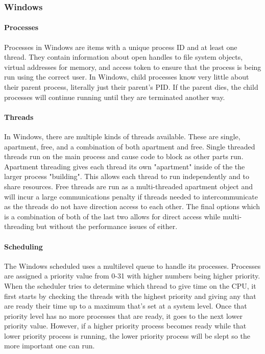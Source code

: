 \subsubsection{Windows}
\paragraph{Processes}
Processes in Windows are items with a unique process ID and at least one thread. They contain information about open handles to file system objects, virtual addresses for memory, and access token to ensure that the process is being run using the correct user. In Windows, child processes know very little about their parent process, literally just their parent's PID. If the parent dies, the child processes will continue running until they are terminated another way. 
\paragraph{Threads}
In Windows, there are multiple kinds of threads available. These are single, apartment, free, and a combination of both apartment and free. Single threaded threads run on the main process and cause code to block as other parts run. Apartment threading gives each thread its own "apartment" inside of the the larger process "building". This allows each thread to run independently and to share resources. Free threads are run as a multi-threaded apartment object and will incur a large communications penalty if threads needed to intercommunicate as the threads do not have direction access to each other. The final options which is a combination of both of the last two allows for direct access while multi-threading but without the performance issues of either.
\paragraph{Scheduling}
The Windows scheduled uses a multilevel queue to handle its processes. Processes are assigned a priority value from 0-31 with higher numbers being higher priority. When the scheduler tries to determine which thread to give time on the CPU, it first starts by checking the threads with the highest priority and giving any that are ready their time up to a maximum that's set at a system level. Once that priority level has no more processes that are ready, it goes to the next lower priority value. However, if a higher priority process becomes ready while that lower priority process is running, the lower priority process will be slept so the more important one can run. 


